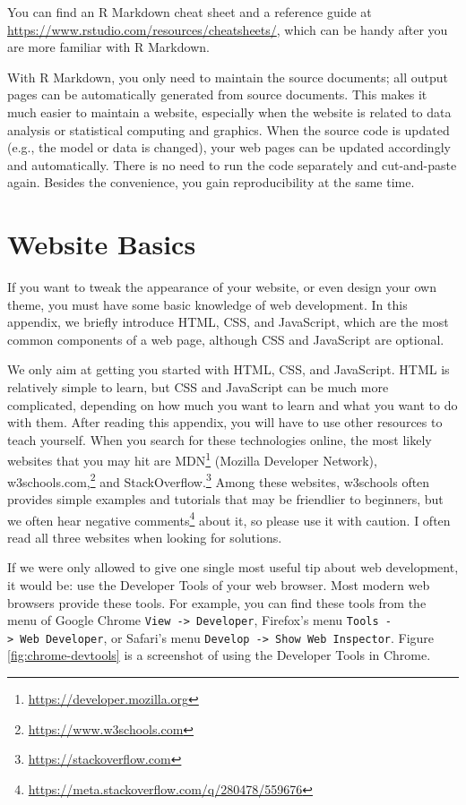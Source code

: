 \documentclass[12pt,]{krantz}
\renewcommand{\href}[2]{#2\footnote{\url{#1}}}
\theoremstyle{definition}
\theoremstyle{definition}
\theoremstyle{definition}
\theoremstyle{remark}
\begin{document}
You can find an R Markdown cheat sheet and a reference guide at
\url{https://www.rstudio.com/resources/cheatsheets/}, which can be handy
after you are more familiar with R Markdown.

With R Markdown, you only need to maintain the source documents; all
output pages can be automatically generated from source documents. This
makes it much easier to maintain a website, especially when the website
is related to data analysis or statistical computing and graphics. When
the source code is updated (e.g., the model or data is changed), your
web pages can be updated accordingly and automatically. There is no need
to run the code separately and cut-and-paste again. Besides the
convenience, you gain reproducibility at the same time.

\chapter{Website Basics}\label{website-basics}

If you want to tweak the appearance of your website, or even design your
own theme, you must have some basic knowledge of web development. In
this appendix, we briefly introduce HTML, CSS, and JavaScript, which are
the most common components of a web page, although CSS and JavaScript
are optional.

We only aim at getting you started with HTML, CSS, and JavaScript. HTML
is relatively simple to learn, but CSS and JavaScript can be much more
complicated, depending on how much you want to learn and what you want
to do with them. After reading this appendix, you will have to use other
resources to teach yourself. When you search for these technologies
online, the most likely websites that you may hit are
\href{https://developer.mozilla.org}{MDN} (Mozilla Developer Network),
\href{https://www.w3schools.com}{w3schools.com,} and
\href{https://stackoverflow.com}{StackOverflow.} Among these websites,
w3schools often provides simple examples and tutorials that may be
friendlier to beginners, but we often hear
\href{https://meta.stackoverflow.com/q/280478/559676}{negative comments}
about it, so please use it with caution. I often read all three websites
when looking for solutions.

If we were only allowed to give one single most useful tip about web
development, it would be: use the Developer Tools of your web browser.
Most modern web browsers provide these tools. For example, you can find
these tools from the menu of Google Chrome
\texttt{View\ -\textgreater{}\ Developer}, Firefox's menu
\texttt{Tools\ -\textgreater{}\ Web\ Developer}, or Safari's menu
\texttt{Develop\ -\textgreater{}\ Show\ Web\ Inspector}. Figure
\ref{fig:chrome-devtools} is a screenshot of using the Developer Tools
in Chrome.
\end{document}
